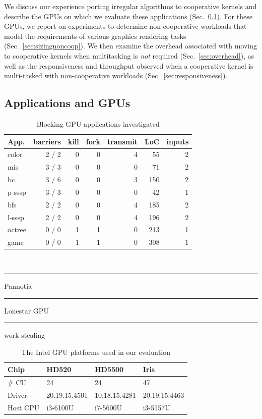 \documentclass[numbers,nocopyrightspace,10pt]{sigplanconf}
\newcommand\crule[3][black]{\textcolor{#1}{\rule{#2}{#3}}}
\newcommand{\mysec}{Sec.~}
\begin{document}
We discuss our experience porting irregular algorithms to cooperative kernels and describe the GPUs on which we evaluate these applications (\mysec\ref{sec:portingalgorithms}).  For these GPUs, we report on experiments to determine non-cooperative workloads that model the requirements of various graphics rendering tasks (\mysec\ref{sec:sizingnoncoop}).  We then examine the overhead associated with moving to cooperative kernels when multitasking is \emph{not} required (\mysec\ref{sec:overhead}), as well as the responsiveness and throughput observed when a cooperative kernel is multi-tasked with non-cooperative workloads (\mysec\ref{sec:responsiveness}).

\subsection{Applications and GPUs}\label{sec:portingalgorithms}

\begin{table}[t]
\small
\centering
\begin{tabular}{ l r r r r r r}
App. & barriers & kill & fork & transmit & LoC & inputs\\
\hline
\rowcolor{Gray1}
color & 2 / 2 & 0 & 0 & 4 & 55 & 2\\
\rowcolor{Gray1}
mis & 3 / 3 & 0 & 0 & 0 & 71 & 2\\
\rowcolor{Gray1}
bc & 3 / 6 & 0 & 0 & 3 & 150 & 2\\
\rowcolor{Gray1}
p-sssp & 3 / 3 & 0 & 0 & 0  & 42 & 1\\
\rowcolor{Gray2}
bfs & 2 / 2 & 0 & 0  & 4  & 185 & 2\\
\rowcolor{Gray2}
l-sssp & 2 / 2 & 0 & 0  & 4  & 196 & 2\\
\rowcolor{Gray3}
octree & 0 / 0 & 1 & 1 & 0 & 213 & 1 \\
\rowcolor{Gray3}
game & 0 / 0 & 1 & 1 & 0 & 308 & 1 \\
\end{tabular} \\
\vspace{.2cm}
\crule[Gray1]{.2cm}{.2cm} Pannotia \hspace{.4cm} \crule[Gray2]{.2cm}{.2cm} Lonestar GPU  \hspace{.4cm}  \crule[Gray3]{.2cm}{.2cm} work stealing
\caption{Blocking GPU applications investigated}
\label{tab:applications}
\end{table}

\begin{table}[h]
\footnotesize
\centering
\begin{tabular}{ l l l l }
Chip & HD520 & HD5500 & Iris\\
\hline
\# CU  & 24 & 24 & 47 \\
Driver   & 20.19.15.4501 & 10.18.15.4281 & 20.19.15.4463 \\
Host CPU & i3-6100U & i7-5600U & i3-5157U \\
\end{tabular}
\caption{The Intel GPU platforms used in our evaluation}
\label{tab:chipstested}
\end{table}
\end{document}

